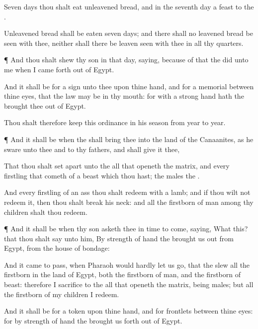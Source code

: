 {Seven
days thou shalt
eat unleavened
bread, and in the
seventh
day
{} a
feast to the
{}.

Unleavened
bread shall be
eaten
seven
days; and there shall no leavened
bread be
seen with thee, neither shall there be
leaven
seen with thee in all thy
quarters.


\par }{\PP {}¶ And thou shalt
shew thy
son in that
day,
saying,
{} because
of
that
{} the
{}
did unto me when I came
forth out of
Egypt.

And it shall be for a
sign unto thee upon thine
hand, and for a
memorial between thine
eyes, that the
{}
law may be in thy
mouth: for with a
strong
hand hath the
{} brought thee
out of
Egypt.

Thou shalt therefore
keep this
ordinance in his
season from
year to
year.


\par }{\PP {}¶ And it shall be when the
{} shall
bring thee into the
land of the
Canaanites, as he
sware unto thee and to thy
fathers, and shall
give it thee,

That thou shalt set
apart unto the
{} all that
openeth the
matrix, and every
firstling that
cometh of a
beast which thou hast; the
males
{} the
{}.

And every
firstling of an
ass thou shalt
redeem with a
lamb; and if thou wilt not
redeem it, then thou shalt break his
neck: and all the
firstborn of
man among thy
children shalt thou
redeem.


\par }{\PP {}¶ And it shall be when thy
son
asketh thee in time to
come,
saying, What
{} this? that thou shalt
say unto him, By
strength of
hand the
{} brought us
out from
Egypt, from the
house of
bondage:

And it came to pass, when
Pharaoh would
hardly let us
go, that the
{}
slew all the
firstborn in the
land of
Egypt, both the
firstborn of
man, and the
firstborn of
beast: therefore I
sacrifice to the
{} all that
openeth the
matrix, being
males; but all the
firstborn of my
children I
redeem.

And it shall be for a
token upon thine
hand, and for
frontlets between thine
eyes: for by
strength of
hand the
{} brought us
forth out of
Egypt.


}
